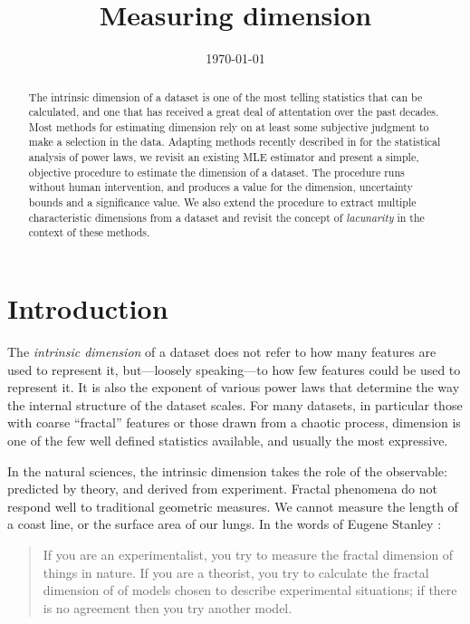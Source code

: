\documentclass[10pt]{article}
\title{Measuring dimension}
\date{\today}
\begin{document}
\maketitle

\begin{abstract}
\noindent The intrinsic dimension of a dataset is one of the most telling statistics that can be calculated, and one that has received a great deal of attentation over the past decades. Most methods for estimating dimension rely on at least some subjective judgment to make a selection in the data. Adapting methods recently described in \cite{clauset2007power} for the statistical analysis of power laws, we revisit an existing MLE estimator and present a simple, objective procedure to estimate the dimension of a dataset. The procedure runs without human intervention, and produces a value for the dimension, uncertainty bounds and a significance value. We also extend the procedure to extract multiple characteristic dimensions from a dataset and revisit the concept of \textit{lacunarity} in the context of these methods.\end{abstract}
\section{Introduction}
The \textit{intrinsic dimension} of a dataset does not refer to how many features are used to represent it, but---loosely speaking---to how few features could be used to represent it. It is also the exponent of various power laws that determine the way the internal structure of the dataset scales. For many datasets, in particular those with coarse ``fractal'' features or those drawn from a chaotic process, dimension is one of the few well defined statistics available, and usually the most expressive.

In the natural sciences, the intrinsic dimension takes the role of the observable: predicted by theory, and derived from experiment. Fractal phenomena do not respond well to traditional geometric measures. We cannot measure the length of a coast line, or the surface area of our lungs. In the words of Eugene Stanley \cite{stanley1986growth}:

\begin{quotation}
\small
\noindent If you are an experimentalist, you try to measure the fractal dimension of things in nature. If you are a theorist, you try to calculate the fractal dimension of of models chosen to describe experimental situations; if there is no agreement then you try another model.
\end{quotation}
\end{document}
